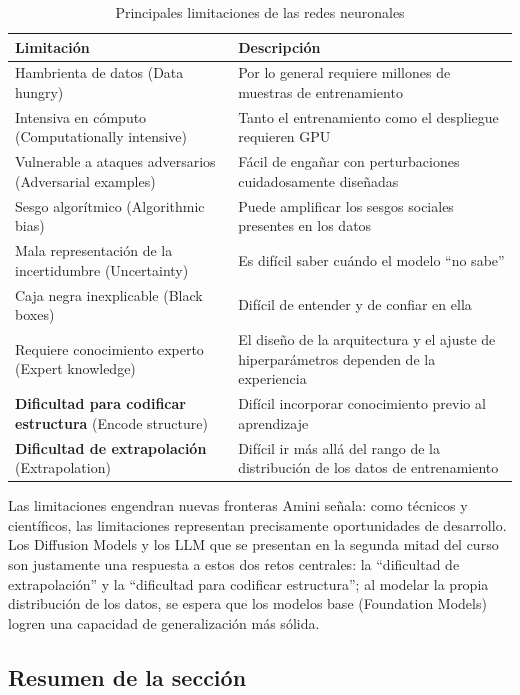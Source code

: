 \begin{table}[H]
\centering
\begin{tabular}{ll}
\toprule
\textbf{Limitación} & \textbf{Descripción} \\
\midrule
Hambrienta de datos (Data hungry) & Por lo general requiere millones de muestras de entrenamiento \\
Intensiva en cómputo (Computationally intensive) & Tanto el entrenamiento como el despliegue requieren GPU \\
Vulnerable a ataques adversarios (Adversarial examples) & Fácil de engañar con perturbaciones cuidadosamente diseñadas \\
Sesgo algorítmico (Algorithmic bias) & Puede amplificar los sesgos sociales presentes en los datos \\
Mala representación de la incertidumbre (Uncertainty) & Es difícil saber cuándo el modelo ``no sabe'' \\
Caja negra inexplicable (Black boxes) & Difícil de entender y de confiar en ella \\
Requiere conocimiento experto (Expert knowledge) & El diseño de la arquitectura y el ajuste de hiperparámetros dependen de la experiencia \\
\textbf{Dificultad para codificar estructura} (Encode structure) & Difícil incorporar conocimiento previo al aprendizaje \\
\textbf{Dificultad de extrapolación} (Extrapolation) & Difícil ir más allá del rango de la distribución de los datos de entrenamiento \\
\bottomrule
\end{tabular}
\caption{Principales limitaciones de las redes neuronales}
\end{table}

\begin{knowledgebox}{Las limitaciones engendran nuevas fronteras}
Amini señala: como técnicos y científicos, las limitaciones representan precisamente oportunidades de desarrollo. Los Diffusion Models y los LLM que se presentan en la segunda mitad del curso son justamente una respuesta a estos dos retos centrales: la ``dificultad de extrapolación'' y la ``dificultad para codificar estructura''; al modelar la propia distribución de los datos, se espera que los modelos base (Foundation Models) logren una capacidad de generalización más sólida.
\end{knowledgebox}

\subsection{Resumen de la sección}

